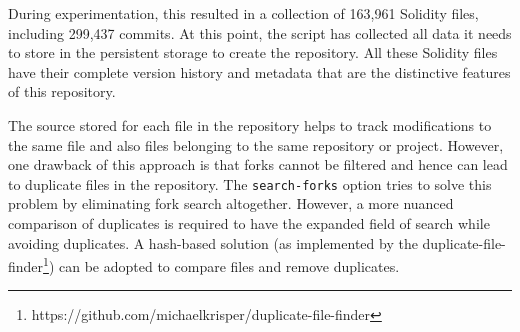 \documentclass[10pt,conference]{IEEEtran}
\begin{document}
\begin{itemize}
		During experimentation, this resulted in a collection of 163,961 Solidity files, including 299,437 commits. At this point, the script has collected all data it needs to store in the persistent storage to create the repository. All these 
		Solidity files have their complete version history and metadata that are the distinctive features of this repository.
		
		The source stored for each file in the repository helps to track modifications to the same file and also files belonging to the same repository or project. However, one drawback of this approach is that forks cannot be filtered and hence can lead to duplicate files in the repository. The \texttt{search-forks} option tries to solve this problem by eliminating fork search altogether. However, a more nuanced comparison of duplicates is required to have the expanded field of search while avoiding duplicates. A hash-based solution (as implemented by the duplicate-file-finder\footnote{https://github.com/michaelkrisper/duplicate-file-finder}) can be adopted to compare files and remove duplicates. 
		

\end{itemize}
\end{document}
